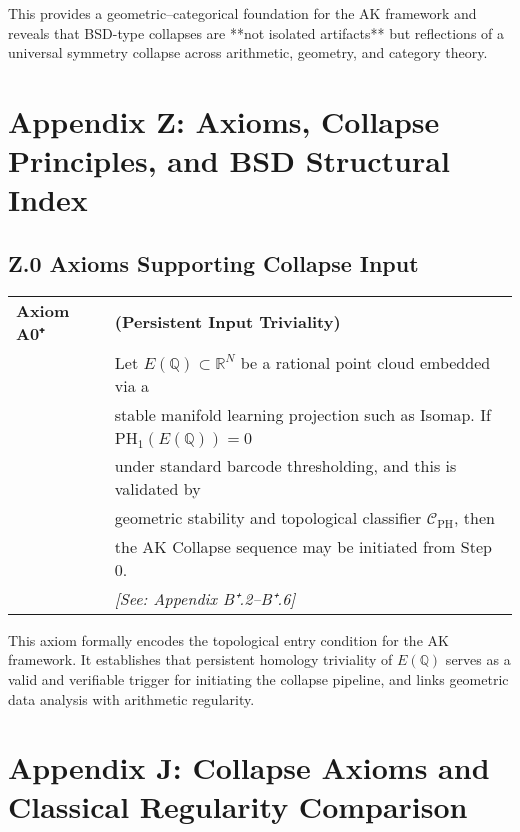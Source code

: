 \documentclass[11pt]{article}
\theoremstyle{definition}
\begin{document}
This provides a geometric–categorical foundation for the AK framework  
and reveals that BSD-type collapses are **not isolated artifacts**  
but reflections of a universal symmetry collapse across arithmetic, geometry, and category theory.




\section*{Appendix Z: Axioms, Collapse Principles, and BSD Structural Index}

\subsection*{Z.0 Axioms Supporting Collapse Input}

\begin{tabular}{ll}
\textbf{Axiom A0⁺} & \textbf{(Persistent Input Triviality)} \\
& Let \( E(\mathbb{Q}) \subset \mathbb{R}^N \) be a rational point cloud embedded via a \\
& stable manifold learning projection such as Isomap. If \\
& \quad \( \mathrm{PH}_1(E(\mathbb{Q})) = 0 \) \\
& under standard barcode thresholding, and this is validated by \\
& geometric stability and topological classifier \( \mathcal{C}_{\mathrm{PH}} \), then \\
& the AK Collapse sequence may be initiated from Step 0. \\
& \textit{[See: Appendix B⁺.2–B⁺.6]}
\end{tabular}

\vspace{1em}
\noindent
This axiom formally encodes the topological entry condition for the AK framework.  
It establishes that persistent homology triviality of \( E(\mathbb{Q}) \) serves as a valid and verifiable trigger  
for initiating the collapse pipeline, and links geometric data analysis with arithmetic regularity.



\section*{Appendix J: Collapse Axioms and Classical Regularity Comparison}
\end{document}
